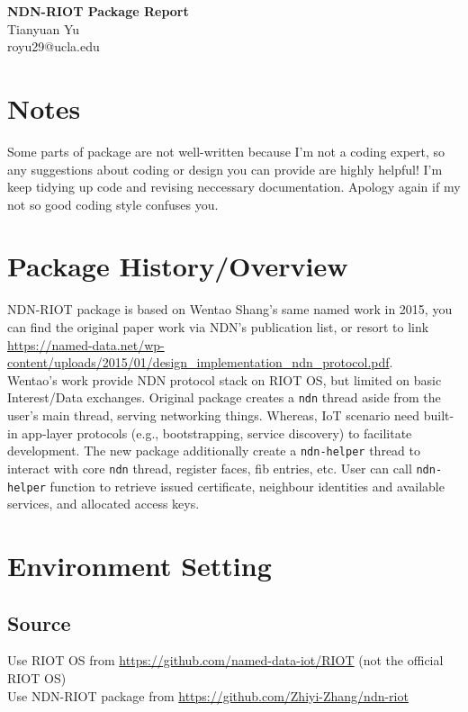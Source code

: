 \documentclass[a4paper, 11pt]{article}
\begin{document}
    \noindent
    \large\textbf{NDN-RIOT Package Report} \\ 
    \normalsize Tianyuan Yu \\ royu29@ucla.edu
    
    \section*{Notes}
    Some parts of package are not well-written because I'm not a coding expert, so any suggestions about coding or design you can provide are highly helpful! I'm keep tidying up code and revising neccessary documentation. Apology again if my not so good coding style confuses you.
    
    \section*{Package History/Overview}
    NDN-RIOT package is based on Wentao Shang's same named work in 2015, you can find the original paper work via NDN's publication list, or resort to link \url{https://named-data.net/wp-content/uploads/2015/01/design_implementation_ndn_protocol.pdf}.\\ Wentao's work provide NDN protocol stack on RIOT OS, but limited on basic Interest/Data exchanges. Original package creates a \texttt{ndn} thread aside from the user's main thread, serving networking things. Whereas, IoT scenario need built-in app-layer protocols (e.g., bootstrapping, service discovery) to facilitate development. The new package additionally create a \texttt{ndn-helper} thread to interact with core \texttt{ndn} thread, register faces, fib entries, etc. User can call \texttt{ndn-helper} function to retrieve issued certificate, neighbour identities and available services, and allocated access keys.
    
    \section*{Environment Setting}
    \subsection*{Source}
    Use RIOT OS from \url{https://github.com/named-data-iot/RIOT} (not the official RIOT OS)\\
    Use NDN-RIOT package from \url{https://github.com/Zhiyi-Zhang/ndn-riot}
\end{document}
